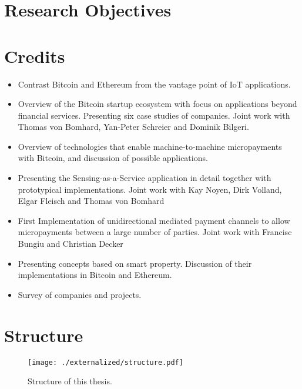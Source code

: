 \section{Research Objectives}


\section{Credits}


 

\begin{itemize}
\item{Contrast Bitcoin and Ethereum from the vantage point of IoT applications.}
\item{Overview of the Bitcoin startup ecosystem with focus on applications beyond financial services. Presenting six case studies of companies. Joint work with Thomas von Bomhard, Yan-Peter Schreier and Dominik Bilgeri.}
\item{Overview of technologies that enable machine-to-machine micropayments with Bitcoin, and discussion of possible applications.}
\item{Presenting the Sensing-as-a-Service application in detail together with prototypical implementations. Joint work with Kay Noyen, Dirk Volland, Elgar Fleisch and Thomas von Bomhard}
\item{First Implementation of unidirectional mediated payment channels to allow micropayments between a large number of parties. Joint work with Francisc Bungiu and Christian Decker}
\item{Presenting concepts based on smart property. Discussion of their implementations in Bitcoin and Ethereum.}
\item{Survey of companies and projects.}
\end{itemize}

\newpage
\section{Structure}

\begin{figure}
\centering
\texttt{[image: ./externalized/structure.pdf]}
\caption{Structure of this thesis.}
\label{fig:structure}
\end{figure}
